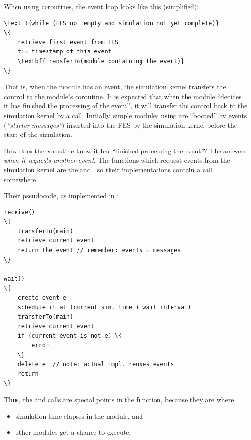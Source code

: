 When using coroutines, the event loop looks like
this (simplified):


\begin{Verbatim}[commandchars=\\\{\}]
\textit{while (FES not empty and simulation not yet complete)}
\{
    retrieve first event from FES
    t:= timestamp of this event
    \textbf{transferTo(module containing the event)}
\}
\end{Verbatim}



That is, when the module has an event, the simulation
kernel transfers the control to the module's coroutine. It is expected
that when the module ``decides it has finished the processing of the
event'', it will transfer the control back to the simulation kernel by
a  call. Initially,
simple modules using  are
``booted'' by events (\textit{''starter messages''})
inserted into the FES by the simulation kernel before the
start of the simulation.


How does the coroutine know it has ``finished processing the event''?
The answer: \textit{when it requests another event}.  The functions
which request events from the simulation kernel are the
 and , so their
implementations contain a  call
somewhere.


Their pseudocode, as implemented in {\opp}:


\begin{Verbatim}[commandchars=\\\{\}]
receive()
\{
    transferTo(main)
    retrieve current event
    return the event // remember: events = messages
\}

wait()
\{
    create event e
    schedule it at (current sim. time + wait interval)
    transferTo(main)
    retrieve current event
    if (current event is not e) \{
        error
    \}
    delete e  // note: actual impl. reuses events
    return
\}
\end{Verbatim}



Thus, the  and  calls are
special points in the  function, because
they are where

\begin{itemize}
  \item{simulation time elapses in the module, and}
  \item{other modules get a chance to execute.}
\end{itemize}


